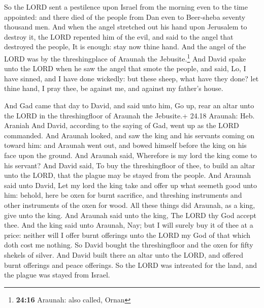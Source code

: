  So the LORD sent a pestilence upon Israel from the
morning even to the time appointed: and there died of the people from
Dan even to Beer-sheba seventy thousand men.  And when
the angel stretched out his hand upon Jerusalem to destroy it, the LORD
repented him of the evil, and said to the angel that destroyed the
people, It is enough: stay now thine hand. And the angel of the LORD was
by the threshingplace of Araunah the Jebusite.\footnote{\textbf{24:16}
  Araunah: also called, Ornan}  And David spake unto the
LORD when he saw the angel that smote the people, and said, Lo, I have
sinned, and I have done wickedly: but these sheep, what have they done?
let thine hand, I pray thee, be against me, and against my father's
house.

 And Gad came that day to David, and said unto him, Go
up, rear an altar unto the LORD in the threshingfloor of Araunah the
Jebusite.+ 24.18 Araunah: Heb. Araniah  And David,
according to the saying of Gad, went up as the LORD commanded.
 And Araunah looked, and saw the king and his servants
coming on toward him: and Araunah went out, and bowed himself before the
king on his face upon the ground.  And Araunah said,
Wherefore is my lord the king come to his servant? And David said, To
buy the threshingfloor of thee, to build an altar unto the LORD, that
the plague may be stayed from the people.  And Araunah
said unto David, Let my lord the king take and offer up what seemeth
good unto him: behold, here be oxen for burnt sacrifice, and threshing
instruments and other instruments of the oxen for wood. 
All these things did Araunah, as a king, give unto the king. And Araunah
said unto the king, The LORD thy God accept thee.  And
the king said unto Araunah, Nay; but I will surely buy it of thee at a
price: neither will I offer burnt offerings unto the LORD my God of that
which doth cost me nothing. So David bought the threshingfloor and the
oxen for fifty shekels of silver.  And David built there
an altar unto the LORD, and offered burnt offerings and peace offerings.
So the LORD was intreated for the land, and the plague was stayed from
Israel.
